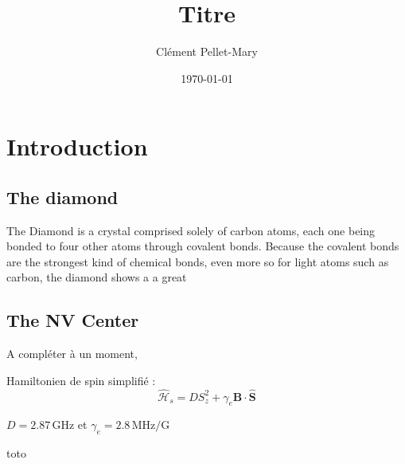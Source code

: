 \documentclass[a4paper]{report}
\title{Titre}
\author{Clément Pellet-Mary}
\date\today
\begin{document}
\chapter{Introduction}
  \section{The diamond}
  The Diamond is a crystal comprised solely of carbon atoms, each one being bonded to four other atoms through covalent bonds. Because the covalent bonds are the strongest kind of chemical bonds, even more so for light atoms such as carbon, the diamond shows a a great
  
  \section{The NV Center}
  A compléter à un moment,
  
  Hamiltonien de spin simplifié : 
  \begin{equation}
  \hat{\mathcal{H}}_s=D S_z^2 + \gamma_e \textbf{B}\cdot\hat{\textbf{S}}
  \end{equation}
  \begin{center}
  $D=2.87 \,$GHz et $\gamma_e=2.8\,\mathrm{MHz}/\mathrm{G}$
\end{center}   
  
  toto
 
  
\end{document}
